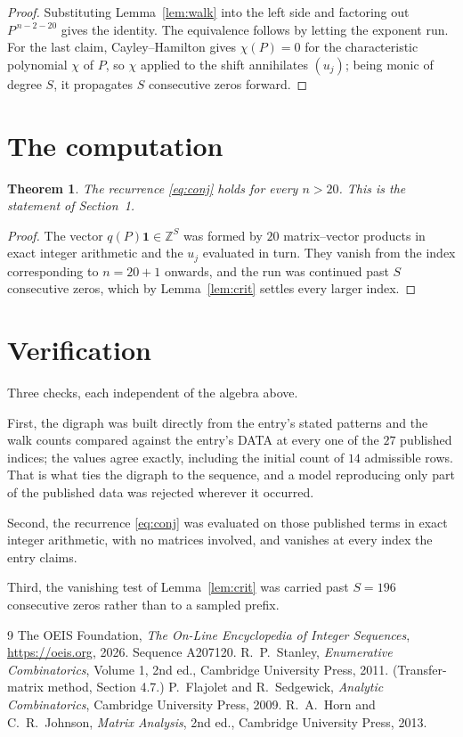 \documentclass[11pt,a4paper]{article}
\theoremstyle{plain}
\newtheorem{theorem}{Theorem}
\theoremstyle{definition}
\begin{document}
\begin{proof}
Substituting Lemma~\ref{lem:walk} into the left side and factoring out
$P^{\,n-2-20}$ gives the identity. The equivalence follows by letting the exponent
run. For the last claim, Cayley--Hamilton gives $\chi(P)=0$ for the characteristic
polynomial $\chi$ of $P$, so $\chi$ applied to the shift annihilates $(u_j)$; being monic of
degree $S$, it propagates $S$ consecutive zeros forward.
\end{proof}

\section{The computation}

\begin{theorem}
The recurrence \eqref{eq:conj} holds for every $n>20$. This is the statement of
Section~1.
\end{theorem}

\begin{proof}
The vector $q(P)\mathbf{1}\in\mathbb{Z}^{S}$ was formed by $20$ matrix--vector
products in exact integer arithmetic and the $u_j$ evaluated in turn. They vanish from the
index corresponding to $n=20+1$ onwards, and the run was continued past $S$ consecutive
zeros, which by Lemma~\ref{lem:crit} settles every larger index.
\end{proof}

\section{Verification}

Three checks, each independent of the algebra above.

First, the digraph was built directly from the entry's stated patterns and the walk counts
compared against the entry's DATA at every one of the $27$ published indices; the
values agree exactly, including the initial count of $14$ admissible rows. That is
what ties the digraph to the sequence, and a model reproducing only part of the published
data was rejected wherever it occurred.

Second, the recurrence \eqref{eq:conj} was evaluated on those published terms in exact
integer arithmetic, with no matrices involved, and vanishes at every index the entry claims.

Third, the vanishing test of Lemma~\ref{lem:crit} was carried past $S=196$ consecutive
zeros rather than to a sampled prefix.

\begin{thebibliography}{9}
 The OEIS Foundation, \emph{The On-Line Encyclopedia of Integer
Sequences}, \url{https://oeis.org}, 2026. Sequence A207120.
 R.~P.~Stanley, \emph{Enumerative Combinatorics}, Volume 1, 2nd ed.,
Cambridge University Press, 2011. (Transfer-matrix method, Section 4.7.)
 P.~Flajolet and R.~Sedgewick, \emph{Analytic Combinatorics}, Cambridge
University Press, 2009.
 R.~A.~Horn and C.~R.~Johnson, \emph{Matrix Analysis}, 2nd ed., Cambridge
University Press, 2013.
\end{thebibliography}
\end{document}
